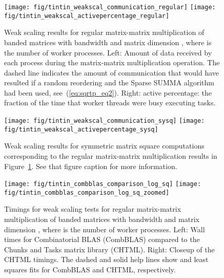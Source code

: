 \documentclass{elsarticle}
\begin{document}
\begin{figure}
  \begin{center}
    \texttt{[image: fig/tintin\_weakscal\_communication\_regular]}
    \texttt{[image: fig/tintin\_weakscal\_activepercentage\_regular]}
  \end{center}
  \caption{Weak scaling results for regular matrix-matrix
    multiplication of banded matrices with bandwidth 
    and matrix dimension , where  is the number
    of worker processes. Left: Amount of data received
    by each process during the matrix-matrix multiplication
    operation. The dashed line indicates the amount of communication
    that would have resulted if a random reordering and the Sparse
    SUMMA algorithm had been used, see~(\ref{eq:sqrtp_eq2}).
    Right: active percentage: the fraction of the time that worker
    threads were busy executing tasks.
    \label{fig:tintin_weakscal_regular}}
\end{figure}

\begin{figure}
  \begin{center}
    \texttt{[image: fig/tintin\_weakscal\_communication\_sysq]}
    \texttt{[image: fig/tintin\_weakscal\_activepercentage\_sysq]}
  \end{center}
  \caption{Weak scaling results for symmetric matrix square
    computations corresponding to the regular matrix-matrix
    multiplication results in
    Figure~\ref{fig:tintin_weakscal_regular}. See that figure caption
    for more information.
    \label{fig:tintin_weakscal_sysq}}
\end{figure}

\begin{figure}
  \begin{center}
    \texttt{[image: fig/tintin\_combblas\_comparison\_log\_sq]}
    \texttt{[image: fig/tintin\_combblas\_comparison\_log\_sq\_zoomed]}
  \end{center}
  \caption{Timings for weak scaling tests for regular matrix-matrix
    multiplication of banded matrices with bandwidth 
    and matrix dimension , where  is the
    number of worker processes. Left: Wall times for Combinatorial
    BLAS (CombBLAS) compared to the Chunks and Tasks matrix library
    (CHTML). Right: Closeup of the CHTML timings.  The dashed and
    solid help lines show  and  least squares fits for CombBLAS and CHTML,
    respectively.
    \label{fig:tintin_combblas_comparison}}
\end{figure}
\end{document}
